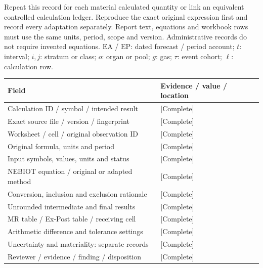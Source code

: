 Repeat this record for each material calculated quantity or link an equivalent controlled calculation ledger. Reproduce the exact original expression first and record every adaptation separately. Report text, equations and workbook rows must use the same units, period, scope and version. Administrative records do not require invented equations.
$\mathrm{EA}$ / $\mathrm{EP}$: dated forecast / period account; $t$: interval; $i,j$: stratum or class; $o$: organ or pool; $g$: gas; $\tau$: event cohort; $\ell$: calculation row.
{\sffamily\fontsize{8.6}{10.7}\selectfont\begin{longtable}{@{}P{82mm}P{82mm}@{}}
\toprule
\textbf{Field} & \textbf{Evidence / value / location}\\\midrule\endhead
\rule{0pt}{8mm}Calculation ID / symbol / intended result & [Complete]\\\hline
\rule{0pt}{8mm}Exact source file / version / fingerprint & [Complete]\\\hline
\rule{0pt}{8mm}Worksheet / cell / original observation ID & [Complete]\\\hline
\rule{0pt}{8mm}Original formula, units and period & [Complete]\\\hline
\rule{0pt}{8mm}Input symbols, values, units and status & [Complete]\\\hline
\rule{0pt}{8mm}NEBIOT equation / original or adapted method & [Complete]\\\hline
\rule{0pt}{8mm}Conversion, inclusion and exclusion rationale & [Complete]\\\hline
\rule{0pt}{8mm}Unrounded intermediate and final results & [Complete]\\\hline
\rule{0pt}{8mm}MR table / Ex-Post table / receiving cell & [Complete]\\\hline
\rule{0pt}{8mm}Arithmetic difference and tolerance settings & [Complete]\\\hline
\rule{0pt}{8mm}Uncertainty and materiality: separate records & [Complete]\\\hline
\rule{0pt}{8mm}Reviewer / evidence / finding / disposition & [Complete]\\\hline
\end{longtable}}
